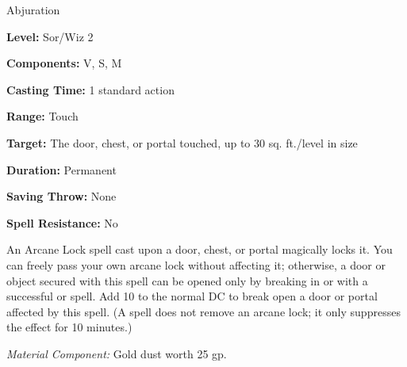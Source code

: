 
Abjuration

\textbf{Level:} Sor/Wiz 2

\textbf{Components:} V, S, M

\textbf{Casting Time:} 1 standard action

\textbf{Range:} Touch

\textbf{Target:} The door, chest, or portal touched, up to 30 sq. ft./level in 
size

\textbf{Duration:} Permanent

\textbf{Saving Throw:} None

\textbf{Spell Resistance:} No

An Arcane Lock spell cast upon a door, chest, or portal magically locks 
it. You can freely pass your own arcane lock without affecting it; otherwise, 
a door or object secured with this spell can be opened only by breaking in or with 
a successful  or  spell. Add 10 to the normal 
DC to break open a door or portal affected by this spell. (A  spell 
does not remove an arcane lock; it only suppresses the effect for 10 minutes.)

\textit{Material Component:} Gold dust worth 25 gp.

